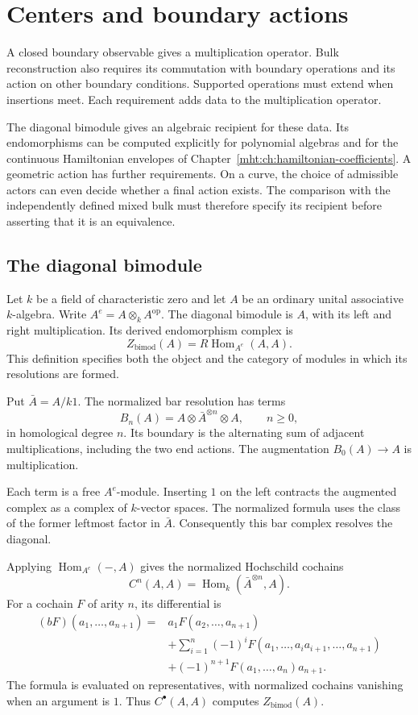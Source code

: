 \chapter{Centers and boundary actions}
\label{mht:ch:centres-actions}

A closed boundary observable gives a multiplication operator.
Bulk reconstruction also requires its commutation with boundary
operations and its action on other boundary conditions. Supported
operations must extend when insertions meet. Each requirement adds
data to the multiplication operator.

The diagonal bimodule gives an algebraic recipient for these data.
Its endomorphisms can be computed explicitly for polynomial algebras
and for the continuous Hamiltonian envelopes of
Chapter~\ref{mht:ch:hamiltonian-coefficients}. A geometric action has
further requirements. On a curve, the choice of admissible actors
can even decide whether a final action exists. The comparison with
the independently defined mixed bulk must therefore specify its
recipient before asserting that it is an equivalence.

\section{The diagonal bimodule}

Let $k$ be a field of characteristic zero and let $A$ be an ordinary
unital associative $k$-algebra. Write $A^e=A\otimes_k A^{\mathrm{op}}$.
The diagonal bimodule is $A$, with its left and right multiplication.
Its derived endomorphism complex is
\[
 Z_{\mathrm{bimod}}(A)=R\operatorname{Hom}_{A^e}(A,A).
\]
This definition specifies both the object and the category of
modules in which its resolutions are formed.

Put $\bar A=A/k1$. The normalized bar resolution has terms
\[
 B_n(A)=A\otimes\bar A^{\otimes n}\otimes A,
 \qquad n\geq0,
\]
in homological degree $n$. Its boundary is the alternating sum of
adjacent multiplications, including the two end actions. The
augmentation $B_0(A)\to A$ is multiplication. 

Each term is a free
$A^e$-module. Inserting $1$ on the left contracts the augmented
complex as a complex of $k$-vector spaces. The normalized formula
uses the class of the former leftmost factor in $\bar A$.
Consequently this bar complex resolves the diagonal.

Applying $\operatorname{Hom}_{A^e}(-,A)$ gives the normalized
Hochschild cochains
\[
 C^n(A,A)=\operatorname{Hom}_k(\bar A^{\otimes n},A).
\]
For a cochain $F$ of arity $n$, its differential is
\begin{align*}
 (bF)(a_1,\ldots,a_{n+1})
 ={}&a_1F(a_2,\ldots,a_{n+1})\\
 &+\sum_{i=1}^n(-1)^i
 F(a_1,\ldots,a_ia_{i+1},\ldots,a_{n+1})\\
 &+(-1)^{n+1}F(a_1,\ldots,a_n)a_{n+1}.
\end{align*}
The formula is evaluated on representatives, with normalized
cochains vanishing when an argument is $1$. Thus
$C^\bullet(A,A)$ computes $Z_{\mathrm{bimod}}(A)$.

